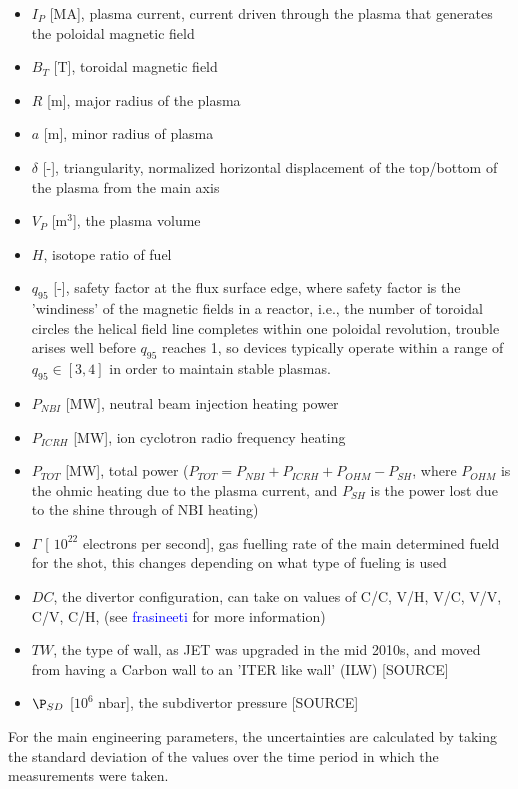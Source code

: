 \documentclass[a4paper, twoside, final, 12pt]{article}
\begin{document}
\begin{itemize}
	\item $I_P$ [MA], plasma current, current driven through the plasma that generates the poloidal magnetic field
	\item $B_T$ [T], toroidal magnetic field 
	\item $R$ [m], major radius of the plasma
	\item $a$ [m], minor radius of plasma
	\item $\delta$ [-], triangularity, normalized horizontal displacement of the top/bottom of the plasma from the main axis
	\item $V_P$ [m$^3$], the plasma volume
	\item $H$, isotope ratio of fuel
	\item $q_{95}$ [-], safety factor at the flux surface edge, where safety factor is the 'windiness' of the magnetic fields in a reactor, i.e., the  number of toroidal circles the helical field line completes within one poloidal revolution, trouble arises well before $q_{95}$ reaches 1, so devices typically operate within a range of $q_{95} \in [3, 4]$ in order to maintain stable plasmas.
	\item $P_{NBI}$ [MW], neutral beam injection heating power
	\item $P_{ICRH}$ [MW], ion cyclotron radio frequency heating 
	\item $P_{TOT}$ [MW], total power ($P_{TOT} = P_{NBI}+ P_{ICRH} + P_{OHM} - P_{SH}$, where $P_{OHM}$ is the ohmic heating due to the plasma current, and $P_{SH}$ is the power lost due to the shine through of NBI heating)
	\item $\Gamma$ [ $10^{22}$ electrons per second], gas fuelling rate of the main determined fueld for the shot, this changes depending on what type of fueling is used 
	\item $DC$, the divertor configuration, can take on values of C/C, V/H, V/C, V/V, C/V, C/H, (see \textcolor{blue}{frasineeti} for more information)
	\item $TW$, the type of wall, as JET was upgraded in the mid 2010s, and moved from having a Carbon wall to an 'ITER like wall' (ILW) [SOURCE]
	\item $\P_{SD}$ [$10^6$ nbar], the subdivertor pressure [SOURCE]
\end{itemize}


For the main engineering parameters, the uncertainties are calculated by taking the standard deviation of the values over the time period in which the measurements were taken. 
\end{document}
